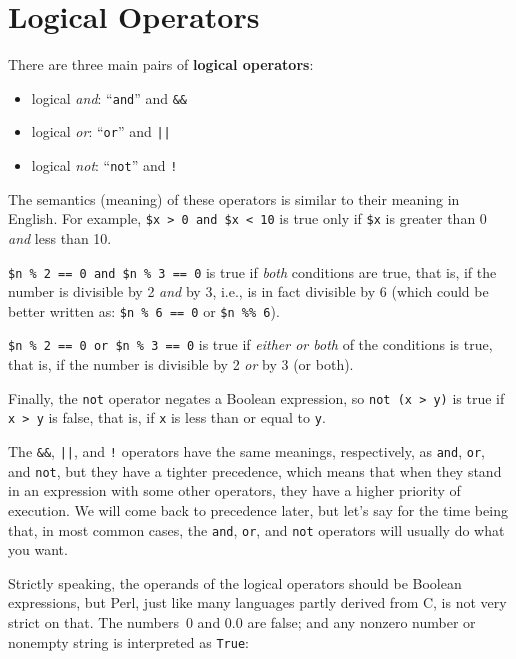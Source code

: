 \section{Logical Operators}

There are three main pairs of {\bf logical operators}: 
\begin{itemize}
\item logical \emph{and}: ``{\tt and}'' and {\tt \&\&}
\item logical \emph{or}: ``{\tt or}'' and {\tt ||}
\item logical \emph{not}: ``{\tt not}'' and {\tt !}
\end{itemize}

The semantics (meaning) of these operators is
similar to their meaning in English.  For example,
{\tt \$x > 0 and \$x < 10} is true only if {\tt \$x} is greater 
than 0 {\em and} less than 10.

{\tt \$n \% 2 == 0 and \$n \% 3 == 0} is true if {\em both} 
conditions are true, that is, if the number is divisible by 2
{\em and} by 3, i.e., is in fact divisible by 6 (which could be better 
written as: {\tt \$n \% 6 == 0} or {\tt \$n \%\% 6}).

{\tt \$n \% 2 == 0 or \$n \% 3 == 0} is true if {\em either or 
both} of the conditions is true, that is, if the number is 
divisible by 2 {\em or} by 3 (or both).

Finally, the {\tt not} operator negates a Boolean
expression, so {\tt not (x > y)} is true if {\tt x > y} 
is false, that is, if {\tt x} is less than or equal 
to {\tt y}.

The {\tt \&\&}, {\tt ||}, and {\tt !} operators have the same 
meanings, respectively, as {\tt and}, {\tt or}, and {\tt not}, 
but they have a tighter precedence, which means that when 
they stand in an expression with some other operators, 
they have a higher priority of execution. We will come 
back to precedence later, but let's say for the time being 
that, in most common cases, the {\tt and}, {\tt or}, and 
{\tt not} operators will usually do what you want.

Strictly speaking, the operands of the logical operators should 
be Boolean expressions, but Perl, just like many languages 
partly derived from C, is not very strict on that. The 
numbers~0 and 0.0 are false; and any nonzero number 
or nonempty string is interpreted as {\tt True}:

